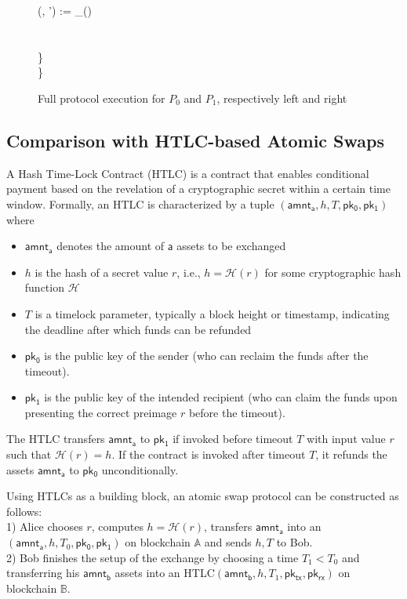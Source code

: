 \begin{figure}[H]
\begin{minipage}[t]{0.5\textwidth}
\begin{pchstack}[boxed]
{        \qquad (, ') := _() \\
        \qquad {} \:\:   \\ %
        \qquad \quad {} \perp \\
        \quad \} \\
        \} \\
    }
    \end{pchstack}
    \end{minipage}%
    \caption{Full protocol execution for $P_0$ and $P_1$, respectively left and right}
    \end{figure}

\subsection{Comparison with HTLC-based Atomic Swaps}

A Hash Time-Lock Contract (HTLC) is a contract that enables conditional payment based on the revelation of a cryptographic secret within a certain time window. Formally, an HTLC is characterized by a tuple  $(\mathsf{amnt_a}, h, T, \mathsf{pk_0}, \mathsf{pk_1})$ where
\begin{itemize}
	\item $\mathsf{amnt_a}$ denotes the amount of $\mathsf{a}$ assets to be exchanged
	\item $h$ is the hash of a secret value $r$, i.e., $h = \mathcal{H}(r)$ for some cryptographic hash function $\mathcal{H}$
	\item $T$ is a timelock parameter, typically a block height or timestamp, indicating the deadline after which funds can be refunded
	\item $\mathsf{pk_0}$ is the public key of the sender (who can reclaim the funds after the timeout).
	\item $\mathsf{pk_1}$ is the public key of the intended recipient (who can claim the funds upon presenting the correct preimage $r$ before the timeout).
\end{itemize}


The HTLC transfers $\mathsf{amnt_a}$ to $\mathsf{pk_1}$ if invoked before timeout $T$ with input value $r$ such that $\mathcal{H}(r) = h$. 
If the contract is invoked after timeout $T$, it refunds the assets $\mathsf{amnt_a}$ to $\mathsf{pk_0}$ unconditionally.

Using HTLCs as a building block, an atomic swap protocol can be constructed as follows: \\
1) Alice chooses $r$, computes $h = \mathcal{H}(r)$, transfers $\mathsf{amnt_a}$ into an $(\mathsf{amnt_a}, h, T_0, \mathsf{pk_0}, \mathsf{pk_1})$ on blockchain $\mathbb{A}$ and sends $h,T$ to Bob. \\
2) Bob finishes the setup of the exchange by choosing a time $T_1 < T_0$ and transferring his $\mathsf{amnt_b}$ assets into an HTLC$(\mathsf{amnt_b}, h, T_1, \mathsf{pk_{tx}}, \mathsf{pk_{rx}})$ on blockchain $\mathbb{B}$.

